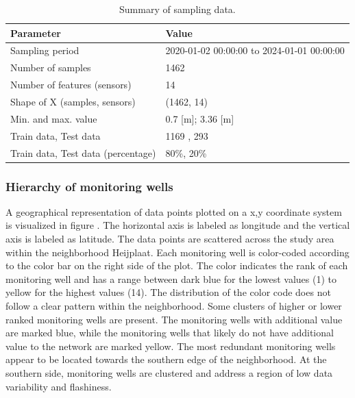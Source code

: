 \begin{table}[htbp]
\centering
\caption{Summary of sampling data.}
\label{dataheij}
\begin{tabular}{|l|l|}
\hline
\textbf{Parameter}                           & \textbf{Value}                                \\ \hline
Sampling period                              & 2020-01-02 00:00:00 to 2024-01-01 00:00:00   \\ \hline
Number of samples                            & 1462                                          \\ \hline
Number of features (sensors)                 & 14                                            \\ \hline
Shape of X (samples, sensors)                & (1462, 14)                                    \\ \hline
Min. and max. value                          & 0.7 [m]; 3.36 [m] \\ \hline
Train data, Test data                        & 1169 , 293                                   \\ \hline
Train data, Test data (percentage)           & 80\%, 20\%                                  \\ \hline
\end{tabular}
\end{table} 

\subsubsection{Hierarchy of monitoring wells}
A geographical representation of data points plotted on a x,y coordinate system is visualized in figure . The horizontal axis is labeled as longitude and the vertical axis is labeled as latitude. The data points are scattered across the study area within the neighborhood Heijplaat. Each monitoring well is color-coded according to the color bar on the right side of the plot. The color indicates the rank of each monitoring well and has a range between dark blue for the lowest values (1) to yellow for the highest values (14). The distribution of the color code does not follow a clear pattern within the neighborhood. Some clusters of higher or lower ranked monitoring wells are present. The monitoring wells with additional value are marked blue, while the monitoring wells that likely do not have additional value to the network are marked yellow. The most redundant monitoring wells appear to be located towards the southern edge of the neighborhood. At the southern side, monitoring wells are clustered and address a region of low data variability and flashiness. 

